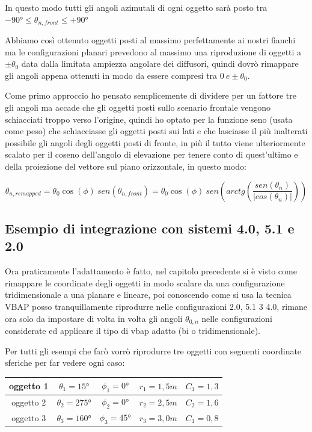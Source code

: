 \documentclass[12pt,a4paper]{report}
\begin{document}
In questo modo tutti gli angoli azimutali di ogni oggetto sarà posto tra $-90° \leq \theta_{n,front} \leq +90°$

Abbiamo così ottenuto oggetti posti al massimo perfettamente ai nostri fianchi ma le configurazioni planari prevedono al massimo una riproduzione di oggetti a $\pm \theta_0$ data dalla limitata ampiezza angolare dei diffusori, quindi dovrò rimappare gli angoli appena ottenuti in modo da essere compresi tra $0\ e \pm \theta_0$.

Come primo approccio ho pensato semplicemente di dividere per un fattore tre gli angoli ma accade che gli oggetti posti sullo scenario frontale vengono schiacciati troppo verso l'origine, quindi ho optato per la funzione seno (usata come peso) che schiacciasse gli oggetti posti sui lati e che lasciasse il più inalterati possibile gli angoli degli oggetti posti di fronte, in più il tutto viene ulteriormente scalato per il coseno dell'angolo di elevazione per tenere conto di quest'ultimo e della proiezione del vettore sul piano orizzontale, in questo modo:

\begin{equation}
\theta_{n, remapped}= \theta_0 \cos(\phi) \ sen (\theta_{n,front}) = \theta_0 \cos(\phi)\ sen \left( arctg  \left( \dfrac{sen(\theta_n)}{\vert cos(\theta_n)\vert } \right)\right)
\label{mmmm}
\end{equation}





\subsection{Esempio di integrazione con sistemi 4.0, 5.1 e 2.0}

Ora praticamente l'adattamento è fatto, nel capitolo precedente si è visto come rimappare le coordinate degli oggetti in modo scalare da una configurazione tridimensionale a una planare e lineare, poi conoscendo come si usa la tecnica VBAP posso tranquillamente riprodurre nelle configurazioni 2.0, 5.1 3 4.0, rimane ora solo da impostare di volta in volta gli angoli $\theta_{0,n}$ nelle configurazioni considerate ed applicare il tipo di vbap adatto (bi o tridimensionale).

Per tutti gli esempi che farò vorrò riprodurre tre oggetti con seguenti coordinate sferiche per far vedere ogni caso:\\

\begin{tabular}{|c|c|c|c|c|}
\hline
oggetto 1 & $\theta_1=15°$ & $\phi_1=0°$ & $r_1=1,5m$ & $C_1=1,3$ \\
\hline
oggetto 2 & $\theta_2=275°$ & $\phi_2=0°$ & $r_2=2,5m$ & $C_2=1,6$ \\
\hline
oggetto 3 & $\theta_3=160°$ & $\phi_3=45°$ & $r_3=3,0m$ & $C_1=0,8$ \\
\hline

\end{tabular} \\ \\
\end{document}
